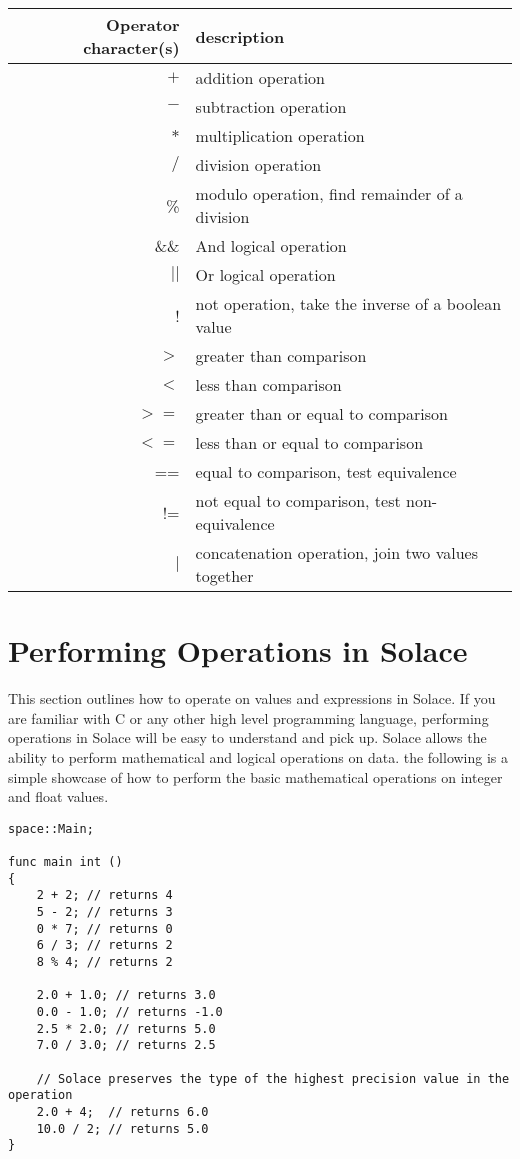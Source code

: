 \documentclass{article}
\begin{document}
\begin{center}
\begin{tabular}{|r|l|}
\hline
Operator character(s) & description \\
\hline
\hline
$+$ & addition operation \\
$-$ & subtraction operation \\
$*$ & multiplication operation \\
$/$ & division operation \\
\% & modulo operation, find remainder of a division \\
\hline
\hline
\&\& & And logical operation \\
$||$ & Or logical operation \\
! & not operation, take the inverse of a boolean value \\
\hline
$>$ & greater than comparison \\
$<$ & less than comparison \\
$>=$ & greater than or equal to comparison \\
$<=$ & less than or equal to comparison \\
== & equal to comparison, test equivalence \\
!= & not equal to comparison, test non-equivalence \\
\hline
\hline
$|$ & concatenation operation, join two values together \\
\hline
\end{tabular}
\end{center}


\section{Performing Operations in Solace}

This section outlines how to operate on values and expressions in Solace. If you are familiar with C or any other high level programming language, performing 
operations in Solace will be easy to understand and pick up. Solace allows the ability to perform mathematical and logical operations on data. the following is a
simple showcase of how to perform the basic mathematical operations on integer and float values.

\begin{lstlisting}
space::Main;

func main int ()
{
	2 + 2; // returns 4
	5 - 2; // returns 3
	0 * 7; // returns 0
	6 / 3; // returns 2
	8 % 4; // returns 2

	2.0 + 1.0; // returns 3.0
	0.0 - 1.0; // returns -1.0
	2.5 * 2.0; // returns 5.0
	7.0 / 3.0; // returns 2.5

	// Solace preserves the type of the highest precision value in the operation
	2.0 + 4;  // returns 6.0
	10.0 / 2; // returns 5.0
}
\end{lstlisting}
\end{document}
